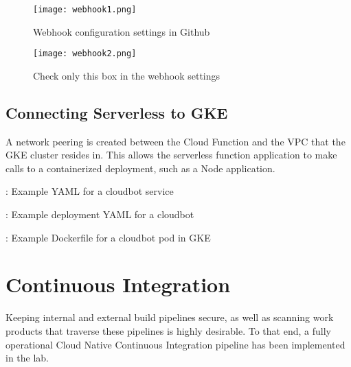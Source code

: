 \begin{figure}[H]
	\texttt{[image: webhook1.png]}
	\caption{Webhook configuration settings in Github}
	\label{pr}
\end{figure}

\begin{figure}[H]
	\texttt{[image: webhook2.png]}
	\caption{Check only this box in the webhook settings}
	\label{pr}
\end{figure}


\subsection{Connecting Serverless to GKE}
\vspace{2mm}

\justifying
A network peering is created between the Cloud Function and the VPC that the GKE cluster resides in.
This allows the serverless function application to make calls to a containerized deployment, such as
a Node application.
\vspace{2mm}

\begin{mybox}{\thetcbcounter: Example YAML for a cloudbot service}
	
\end{mybox}
\vspace{2mm}

\begin{mybox}{\thetcbcounter: Example deployment YAML for a cloudbot}
	
\end{mybox}
\vspace{2mm}

\begin{mybox}{\thetcbcounter: Example Dockerfile for a cloudbot pod in GKE}
	
\end{mybox}
\vspace{2mm}

\section{\label{sec:CI}Continuous Integration}
\vspace{2mm}

Keeping internal and external build pipelines secure, as well as scanning work products that traverse these pipelines is highly desirable. To that end, a
fully operational Cloud Native Continuous Integration pipeline has been implemented in the lab.

